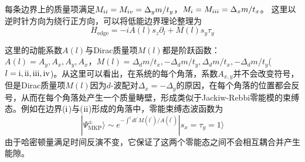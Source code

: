 每条边界上的质量项满足$M_{\uppercase\expandafter{\romannumeral2}}=M_{\uppercase\expandafter{\romannumeral4}}=\Delta_ym/t_y$，$M_{\uppercase\expandafter{\romannumeral1}}=M_{\uppercase\expandafter{\romannumeral3}}=\Delta_xm/t_x$。
这里以逆时针方向为绕行正方向，可以将低能边界理论整理为
\begin{equation}
H_{\mathrm{edge}}=-iA(l)s_z\partial_l+M(l)s_y\tau_y\label{edge2}
\end{equation}

这里的动能系数$A(l)$与Dirac质量项$M(l)$都是阶跃函数：$A(l)=A_y,A_x,A_y,A_x$，$M(l)=\Delta_dm/t_x,-\Delta_dm/t_y,\Delta_dm/t_x,-\Delta_dm/t_y$($l=\mathrm{\uppercase\expandafter{\romannumeral1},\uppercase\expandafter{\romannumeral2},\uppercase\expandafter{\romannumeral3},\uppercase\expandafter{\romannumeral4}}$)。从这里可以看出，在系统的每个角落，系数$A_{x,y}$并不会改变符号，但是Dirac质量项$M(l)$因为$d$-波配对$\Delta_x=-\Delta_y$的原因，在每个角落的位置都会反号，从而在每个角落处产生一个质量畴壁，形成类似于Jackiw-Rebbi零能模\cite{re43,re44}的束缚态。例如在边界($\mathrm{\uppercase\expandafter{\romannumeral1}}$)与($\mathrm{\uppercase\expandafter{\romannumeral2}}$)形成的角落中，零能束缚态波函数为
\begin{equation}
|\Psi^\pm_{\mathrm{MKP}}\rangle\sim e^{-\int^ldl^{'}M(l^{'})/A(l^{'})}|s_x=\tau_y=1\rangle
\end{equation}
由于哈密顿量满足时间反演不变，它保证了这两个零能态之间不会相互耦合并产生能隙。

